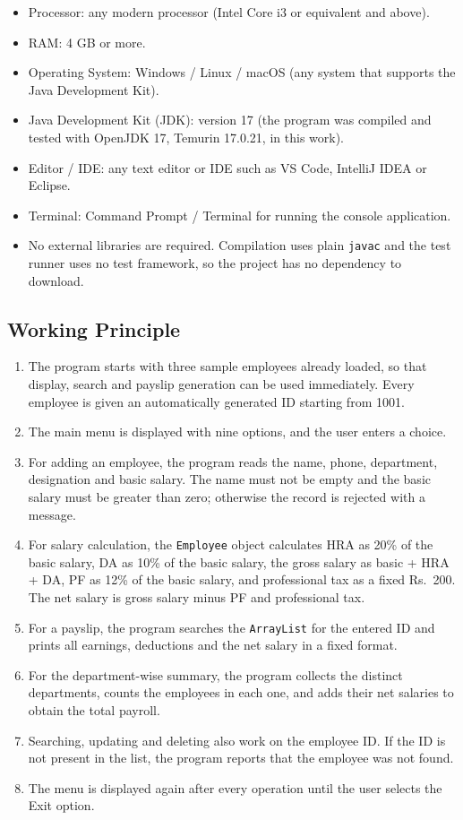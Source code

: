 \documentclass[11pt,a4paper]{article}
\begin{document}
\begin{itemize}
  \item Processor: any modern processor (Intel Core i3 or equivalent and above).
  \item RAM: 4 GB or more.
  \item Operating System: Windows / Linux / macOS (any system that supports the Java Development Kit).
  \item Java Development Kit (JDK): version 17 (the program was compiled and tested with OpenJDK 17, Temurin 17.0.21, in this work).
  \item Editor / IDE: any text editor or IDE such as VS Code, IntelliJ IDEA or Eclipse.
  \item Terminal: Command Prompt / Terminal for running the console application.
  \item No external libraries are required. Compilation uses plain
    \texttt{javac} and the test runner uses no test framework, so the
    project has no dependency to download.
\end{itemize}

\subsection{Working Principle}

\begin{enumerate}
  \item The program starts with three sample employees already loaded,
    so that display, search and payslip generation can be used
    immediately. Every employee is given an automatically generated ID
    starting from 1001.
  \item The main menu is displayed with nine options, and the user
    enters a choice.
  \item For adding an employee, the program reads the name, phone,
    department, designation and basic salary. The name must not be
    empty and the basic salary must be greater than zero; otherwise
    the record is rejected with a message.
  \item For salary calculation, the \texttt{Employee} object
    calculates HRA as 20\% of the basic salary, DA as 10\% of the
    basic salary, the gross salary as basic + HRA + DA, PF as 12\%
    of the basic salary, and professional tax as a fixed
    Rs.~200. The net salary is gross salary minus PF and
    professional tax.
  \item For a payslip, the program searches the \texttt{ArrayList}
    for the entered ID and prints all earnings, deductions and the
    net salary in a fixed format.
  \item For the department-wise summary, the program collects the
    distinct departments, counts the employees in each one, and adds
    their net salaries to obtain the total payroll.
  \item Searching, updating and deleting also work on the employee
    ID. If the ID is not present in the list, the program reports
    that the employee was not found.
  \item The menu is displayed again after every operation until the
    user selects the Exit option.
\end{enumerate}
\end{document}
